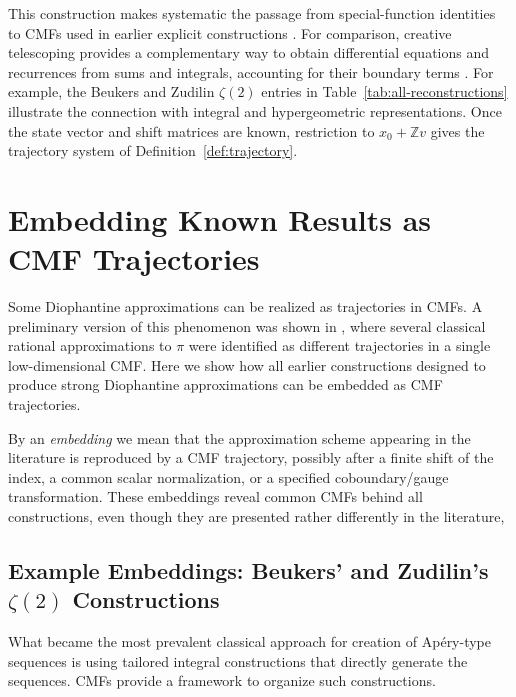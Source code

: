 \documentclass[oneside,english,11pt]{amsart}
\begin{document}
This construction makes systematic the passage from special-function
identities to CMFs used in earlier explicit constructions
\cite{David2023,elimelech2024algorithm,raz2025euler}.
For comparison, creative telescoping provides a complementary way to obtain differential
equations and recurrences from sums and integrals, accounting for their
boundary terms \cite{zeilberger1990holonomic,zeilberger1991method}.
For example, the Beukers and Zudilin $\zeta(2)$ entries in
Table~\ref{tab:all-reconstructions} illustrate the connection with
integral and hypergeometric representations.
Once the state vector and shift matrices are known, restriction to $x_0+\mathbb Zv$ gives the trajectory system of Definition~\ref{def:trajectory}.

\section{Embedding Known Results as CMF Trajectories}
\label{sec:recovery}

Some Diophantine approximations can be realized as trajectories in CMFs.
A preliminary version of this phenomenon was shown in \cite{raz2025euler}, where several classical rational approximations to $\pi$ were identified as different trajectories in a single low-dimensional CMF.
Here we show how all earlier constructions designed to produce strong Diophantine approximations can be embedded as CMF trajectories.

By an \emph{embedding} we mean that the approximation scheme appearing in the literature is reproduced by a CMF trajectory, possibly after a finite shift
of the index, a common scalar normalization, or a specified coboundary/gauge transformation.
These embeddings reveal common CMFs behind all constructions, even though they are presented
rather differently in the literature, 


\subsection{Example Embeddings: Beukers' and Zudilin's \texorpdfstring{$\zeta(2)$}{ζ(2)} Constructions}
\label{subsec:zeta2-recovery}

What became the most prevalent classical approach for creation of Ap\'ery-type sequences is using tailored integral constructions that directly generate the sequences.
CMFs provide a framework to organize such constructions.
\end{document}
